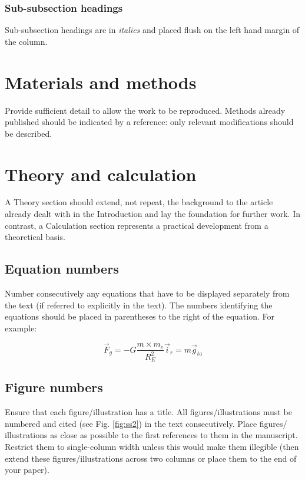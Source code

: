 \documentclass[]{iac}
\begin{document}
\subsubsection{Sub-subsection headings}
Sub-subsection headings are in \textit{italics} and placed flush on the left hand margin of the column.



\section{Materials and methods}
Provide sufficient detail to allow the work to be reproduced. Methods already published should be indicated by a reference: only relevant modifications should be described.




\section{Theory and calculation}
A Theory section should extend, not repeat, the background to the article already dealt with in the Introduction and lay the foundation for further work. In contrast, a Calculation section represents a practical development from a theoretical basis.

\subsection{Equation numbers}

Number consecutively any equations that have to be displayed separately from the text (if referred to explicitly in the text). The numbers identifying the equations should be placed in parentheses to the right of the equation. For example:


\begin{equation}
    \vec{F}_{g} = -G \frac{m\times m_e}{R_E^2}\vec{i}_r = m\vec{g}_{ta}
\end{equation}



\subsection{Figure numbers}
Ensure that each figure/illustration has a title. All figures/illustrations must be numbered and cited (see Fig. \ref{fig:ss2}) in the text consecutively. Place figures/ illustrations as close as possible to the first references to them in the manuscript. Restrict them to single-column width unless this would make them illegible (then extend these figures/illustrations across two columns or place them to the end of your paper).
\end{document}

